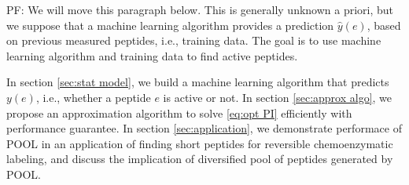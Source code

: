 \documentclass[11pt]{article}
\newcommand{\pfcomment}[1]{\color{blue} PF: #1}
\begin{document}
\pfcomment{We will move this paragraph below.}
This is generally unknown a priori, but we suppose that a machine learning algorithm 
provides a prediction $\hat{y}(e)$, based on previous measured peptides, i.e., training data. 
The goal is to use machine learning algorithm and training data to find active peptides. 


In section \ref{sec:stat model}, we build a machine learning algorithm that predicts
$y(e)$, i.e., whether a peptide $e$ is active or not. In section \ref{sec:approx algo},
we propose an approximation algorithm to solve \eqref{eq:opt PI} efficiently with 
performance guarantee. In section \ref{sec:application}, we demonstrate performace
of POOL in an application of finding short peptides for reversible chemoenzymatic
labeling, and discuss the implication of diversified pool of peptides generated 
by POOL.
\end{document}

